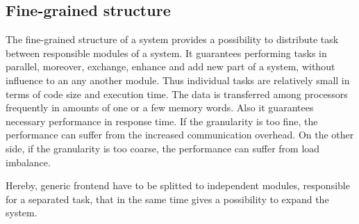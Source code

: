 \subsection {Fine-grained structure}
The fine-grained structure of a system provides a possibility to distribute task between responsible modules of a system. It guarantees performing tasks in parallel, moreover, exchange, enhance and add new part of a system, without influence to an any another module. Thus individual tasks are relatively small in terms of code size and execution time. The data is transferred among processors frequently in amounts of one or a few memory words. Also it guarantees necessary performance in response time. If the granularity is too fine, the performance can suffer from the increased communication overhead. On the other side, if the granularity is too coarse, the performance can suffer from load imbalance.

Hereby, generic frontend have to be splitted to independent modules, responsible for a separated task, that in the same time gives a possibility to expand the system.

